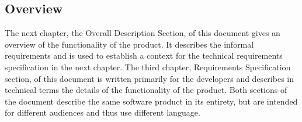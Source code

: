 \subsection{Overview}
The next chapter, the Overall Description Section, of this document gives an overview of the
functionality of the product. It describes the informal requirements and is used to establish a context for the technical requirements specification in the next chapter.
The third chapter, Requirements Specification section, of this document is written primarily for the developers and describes in technical terms the details of the functionality of the product.
Both sections of the document describe the same software product in its entirety, but are intended for different audiences and thus use different language.


